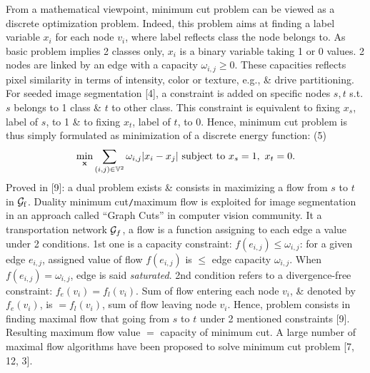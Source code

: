 \documentclass{article}
\begin{document}
\begin{itemize}
\begin{itemize}
        From a mathematical viewpoint, minimum cut problem can be viewed as a discrete optimization problem. Indeed, this problem aims at finding a label variable $x_i$ for each node $v_i$, where label reflects class the node belongs to. As basic problem implies 2 classes only, $x_i$ is a binary variable taking 1 or 0 values. 2 nodes are linked by an edge with a capacity $\omega_{i,j}\ge0$. These capacities reflects pixel similarity in terms of intensity, color or texture, e.g., \& drive partitioning. For seeded image segmentation [4], a constraint is added on specific nodes $s,t$ s.t. $s$ belongs to 1 class \& $t$ to other class. This constraint is equivalent to fixing $x_s$, label of $s$, to 1 \& to fixing $x_t$, label of $t$, to 0. Hence, minimum cut problem is thus simply formulated as minimization of a discrete energy function: (5)
        \begin{equation*}
            \min_{\bf x} \sum_{(i,j)\in\mathbb{V}^2} \omega_{i,j}|x_i - x_j|\mbox{ subject to } x_s = 1,\ x_t = 0.
        \end{equation*}
        Proved in [9]: a dual problem exists \& consists in maximizing a flow from $s$ to $t$ in ${\cal G}_{\rm f}$. Duality minimum cut{\tt/}maximum flow is exploited for image segmentation in an approach called ``Graph Cuts'' in computer vision community. It a transportation network ${\cal G}_f$, a flow is a function assigning to each edge a value under 2 conditions. 1st one is a capacity constraint: $f(e_{i,j})\le\omega_{i,j}$: for a given edge $e_{i,j}$, assigned value of flow $f(e_{i,j})$ is $\le$ edge capacity $\omega_{i,j}$. When $f(e_{i,j}) = \omega_{i,j}$, edge is said {\it saturated}. 2nd condition refers to a divergence-free constraint: $f_e(v_i) = f_l(v_i)$. Sum of flow entering each node $v_i$, \& denoted by $f_e(v_i)$, is $= f_l(v_i)$, sum of flow leaving node $v_i$. Hence, problem consists in finding maximal flow that going from $s$ to $t$ under 2 mentioned constraints [9]. Resulting maximum flow value $=$ capacity of minimum cut. A large number of maximal flow algorithms have been proposed to solve minimum cut problem [7, 12, 3].
        

\end{itemize}
\end{itemize}
\end{document}
